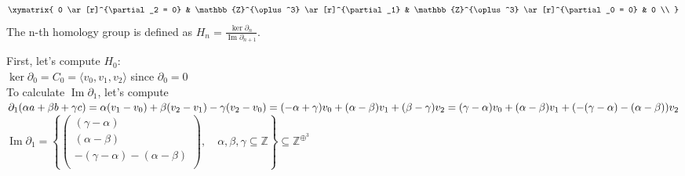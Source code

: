\documentclass[11pt,a4paper]{report}
\DeclareMathOperator{\Ima}{Im}
\begin{document}
			\[
                \xymatrix{
                    0  \ar[r]^{\partial_2 = 0} &
                    \mathbb{Z}^{\oplus^3}  \ar[r]^{\partial_1} &
                    \mathbb{Z}^{\oplus^3}  \ar[r]^{\partial_0 = 0}
                    & 0 \\ }
	        \]
The n-th homology group is defined as $H_n = \frac{\ker\partial_n}{\Ima\partial_{n+1}}$. \\

\par
First, let's compute $H_0$: \\
$\ker\partial_0 = C_0 = \langle v_0, v_1, v_2 \rangle$ since $\partial_0 = 0$ \\
To calculate $\Ima\partial_1$, let's compute $\partial_1(\alpha a + \beta b + \gamma c) = \alpha (v_1-v_0) + \beta (v_2-v_1) - \gamma (v_2-v_0) \\ = (-\alpha + \gamma)v_0 + (\alpha - \beta)v_1 + (\beta - \gamma)v_2 = (\gamma -\alpha)v_0 + (\alpha - \beta)v_1 + (-(\gamma - \alpha)-(\alpha - \beta))v_2 $ \\
$\Ima\partial_1 = \left\{ \left(\begin{array}{c}
          		                 	( \gamma - \alpha )\\
          		                 	(\alpha - \beta)\\
          		                 	-(\gamma - \alpha)-(\alpha - \beta)\\
          		                 \end{array} \right), \quad \alpha, \beta, \gamma \subseteq \mathbb{Z} \right\} \subseteq \mathbb{Z}^{\oplus^3} $ \\
\end{document}

